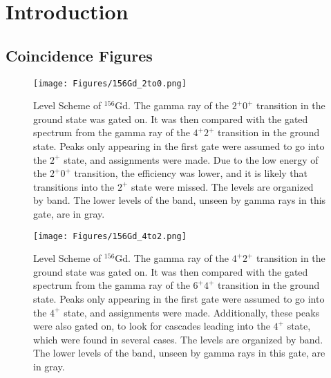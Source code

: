 %
%
%
%
%
%
%
%
%
%


%
%

\chapter{Introduction}

\section{Coincidence Figures}

\begin{figure}
    \centering
    \texttt{[image: Figures/156Gd\_2to0.png]}
    \caption{Level Scheme of $^{156}$Gd. The gamma ray of the $2^+$\rightarrow$0^+$ transition in the ground state was gated on. It was then compared with the gated spectrum from the gamma ray of the $4^+$\rightarrow$2^+$ transition in the ground state. Peaks only appearing in the first gate were assumed to go into the $2^+$ state, and assignments were made. Due to the low energy of the $2^+$\rightarrow$0^+$ transition, the efficiency was lower, and it is likely that transitions into the $2^+$ state were missed. The levels are organized by band. The lower levels of the band, unseen by gamma rays in this gate, are in gray.}
    \label{fig:156_2to0}
\end{figure}

\begin{figure}
    \centering
    \texttt{[image: Figures/156Gd\_4to2.png]}
    \caption{Level Scheme of $^{156}$Gd. The gamma ray of the $4^+$\rightarrow$2^+$ transition in the ground state was gated on. It was then compared with the gated spectrum from the gamma ray of the $6^+$\rightarrow$4^+$ transition in the ground state. Peaks only appearing in the first gate were assumed to go into the $4^+$ state, and assignments were made. Additionally, these peaks were also gated on, to look for cascades leading into the $4^+$ state, which were found in several cases. The levels are organized by band. The lower levels of the band, unseen by gamma rays in this gate, are in gray.}
    \label{fig:156_4to2}
\end{figure}

